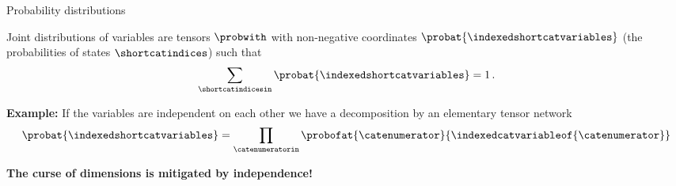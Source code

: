 \documentclass{beamer}
\begin{document}
    \begin{frame}{Probability distributions}

        Joint distributions of variables are tensors $\probwith$ with non-negative coordinates $\probat{\indexedshortcatvariables}$ (the probabilities of states $\shortcatindices$) such that
        \begin{align*}
            \sum_{\shortcatindicesin} \probat{\indexedshortcatvariables} = 1 \, .
        \end{align*}

            {\bf Example:} If the variables are independent on each other we have a decomposition by an elementary tensor network
        \begin{align*}
            \probat{\indexedshortcatvariables}
            = \prod_{\catenumeratorin} \probofat{\catenumerator}{\indexedcatvariableof{\catenumerator}}
        \end{align*}
        \begin{center}
            \bf The curse of dimensions is mitigated by independence!
        \end{center}

    \end{frame}
\end{document}
